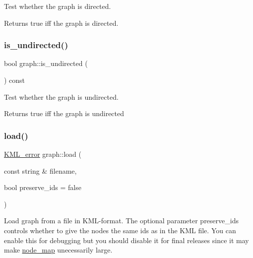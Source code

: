 Test whether the graph is directed.

\begin{DoxyReturn}{Returns}
true iff the graph is directed. 
\end{DoxyReturn}
\mbox{\label{classgraph_aba427ff8ba0f70c68416ec1351344cd8}} 
\subsubsection{\texorpdfstring{is\+\_\+undirected()}{is\_undirected()}}
{\footnotesize\ttfamily bool graph\+::is\+\_\+undirected (\begin{DoxyParamCaption}{ }\end{DoxyParamCaption}) const}

Test whether the graph is undirected.

\begin{DoxyReturn}{Returns}
true iff the graph is undirected 
\end{DoxyReturn}
\mbox{\label{classgraph_a35749ff66d1acd6bbef9852df4f39c95}} 
\subsubsection{\texorpdfstring{load()}{load()}\hspace{0.1cm}{\footnotesize\ttfamily [1/2]}}
{\footnotesize\ttfamily \mbox{\hyperlink{struct_k_m_l__error}{K\+M\+L\+\_\+error}} graph\+::load (\begin{DoxyParamCaption}\item[{const string \&}]{filename,  }\item[{bool}]{preserve\+\_\+ids = {\ttfamily false} }\end{DoxyParamCaption})\hspace{0.3cm}{\ttfamily [inline]}}

Load graph from a file in K\+M\+L-\/format. The optional parameter {\ttfamily preserve\+\_\+ids} controls whether to give the nodes the same ids as in the K\+ML file. You can enable this for debugging but you should disable it for final releases since it may make {\ttfamily \mbox{\hyperlink{classnode__map}{node\+\_\+map}}} unecessarily large. ~\newline
 
